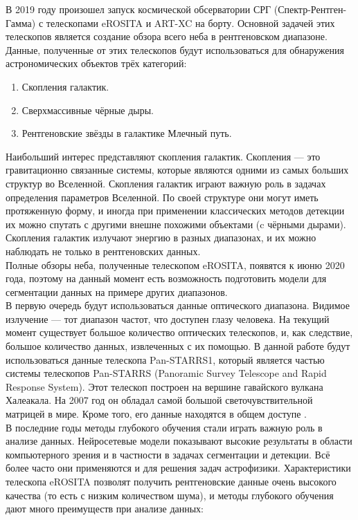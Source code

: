 \Introduction
В 2019 году произошел запуск космической обсерватории СРГ (Спектр-Рентген-Гамма) с телескопами 
eROSITA и ART-XC на борту. Основной задачей этих телескопов является создание обзора всего неба в 
рентгеновском диапазоне. Данные, полученные от этих телескопов будут использоваться для обнаружения 
астрономических объектов трёх категорий:

\begin{enumerate}
    \item Скопления галактик.
    \item Сверхмассивные чёрные дыры.
    \item Рентгеновские звёзды в галактике Млечный путь. 
\end{enumerate}

Наибольший интерес представляют скопления галактик. Скопления --- это гравитационно связанные 
системы, которые являются одними из самых больших структур во Вселенной. Скопления галактик играют 
важную роль в задачах определения параметров Вселенной.
По своей структуре они могут иметь протяженную 
форму, и иногда при применении классических методов детекции их можно спутать с другими внешне 
похожими объектами (c чёрными дырами). Скопления галактик излучают энергию в разных диапазонах, и 
их можно наблюдать не только в рентгеновских данных.\\

Полные обзоры неба, полученные телескопом eROSITA, появятся к июню 2020 года, поэтому на данный 
момент есть возможность подготовить модели для сегментации данных на примере других диапазонов.\\

В первую очередь будут использоваться данные оптического диапазона. Видимое излучение --- тот 
диапазон частот, что доступен глазу человека. На текущий момент существует большое количество 
оптических телескопов, и, как следствие, большое количество данных, извлеченных с их помощью. В 
данной работе будут использоваться данные телескопа Pan-STARRS1, который является частью системы 
телескопов Pan-STARRS (Panoramic Survey Telescope and Rapid Response System). Этот телескоп 
построен на вершине гавайского вулкана Халеакала. На 2007 год он обладал самой большой 
светочувствительной матрицей в мире. Кроме того, его данные находятся в общем доступе \cite{Panstarrs}.\\

В последние годы методы глубокого обучения стали играть важную роль в анализе данных. Нейросетевые 
модели показывают высокие результаты в области компьютерного зрения и в частности в задачах 
сегментации и детекции. Всё более часто они применяются и для решения задач астрофизики. 
Характеристики телескопа eROSITA позволят получить рентгеновские данные очень высокого качества (то 
есть с низким количеством шума), и методы глубокого обучения дают много преимуществ при анализе 
данных: 

